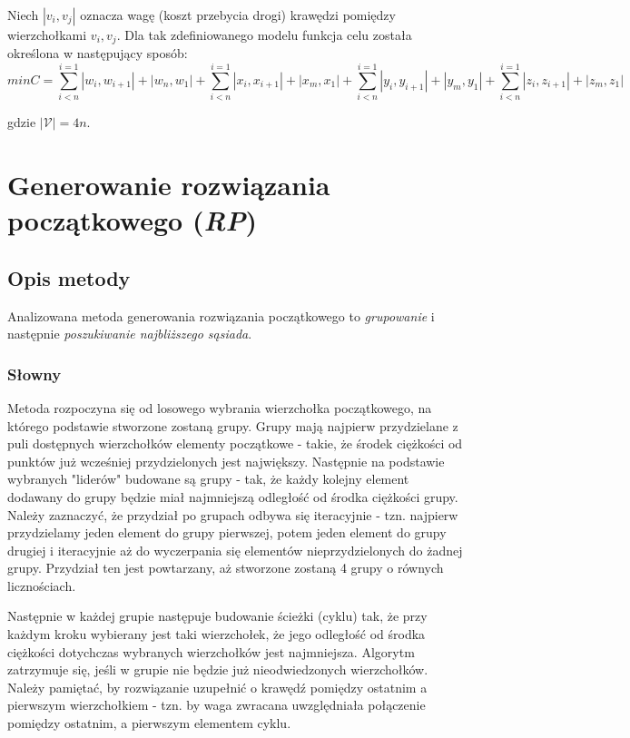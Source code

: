 \documentclass{article}
\begin{document}
Niech $|{v_i, v_j}|$ oznacza wagę (koszt przebycia drogi) krawędzi pomiędzy wierzchołkami $v_i, v_j$. Dla tak zdefiniowanego modelu funkcja celu została określona w następujący sposób:
\begin{equation}
min C = \sum \limits_{i<n}^{i=1} |w_i,w_{i+1}| + |w_n,w_1| + \sum \limits_{i<n}^{i=1} |x_i,x_{i+1}| + |x_m,x_1| + \sum \limits_{i<n}^{i=1} |y_i,y_{i+1}| + |y_m,y_1| + \sum \limits_{i<n}^{i=1} |z_i,z_{i+1}| + |z_m,z_1|
\end{equation}

gdzie $|\mathcal{V}| = 4n$.

\section{Generowanie rozwiązania początkowego (\emph{RP})}
\subsection{Opis metody} \label{sec:rp_section}
Analizowana metoda generowania rozwiązania początkowego to \emph{grupowanie} i następnie \emph{poszukiwanie najbliższego sąsiada}.

\subsubsection{Słowny} \label{sec:slownyrp}
Metoda rozpoczyna się od losowego wybrania wierzchołka początkowego, na którego podstawie stworzone zostaną grupy. Grupy mają najpierw przydzielane z puli dostępnych wierzchołków elementy początkowe - takie, że środek ciężkości od punktów już wcześniej przydzielonych jest największy. Następnie na podstawie wybranych "liderów" budowane są grupy - tak, że każdy kolejny element dodawany do grupy będzie miał najmniejszą odległość od środka ciężkości grupy. Należy zaznaczyć, że przydział po grupach odbywa się iteracyjnie - tzn. najpierw przydzielamy jeden element do grupy pierwszej, potem jeden element do grupy drugiej i iteracyjnie aż do wyczerpania się elementów nieprzydzielonych do żadnej grupy. Przydział ten jest powtarzany, aż stworzone zostaną 4 grupy o równych licznościach.

Następnie w każdej grupie następuje budowanie ścieżki (cyklu) tak, że przy każdym kroku wybierany jest taki wierzchołek, że jego odległość od środka ciężkości dotychczas wybranych wierzchołków jest najmniejsza. Algorytm zatrzymuje się, jeśli w grupie nie będzie już nieodwiedzonych wierzchołków. Należy pamiętać, by rozwiązanie uzupełnić o krawędź pomiędzy ostatnim a pierwszym wierzchołkiem - tzn. by waga zwracana uwzględniała połączenie pomiędzy ostatnim, a pierwszym elementem cyklu.
\end{document}
